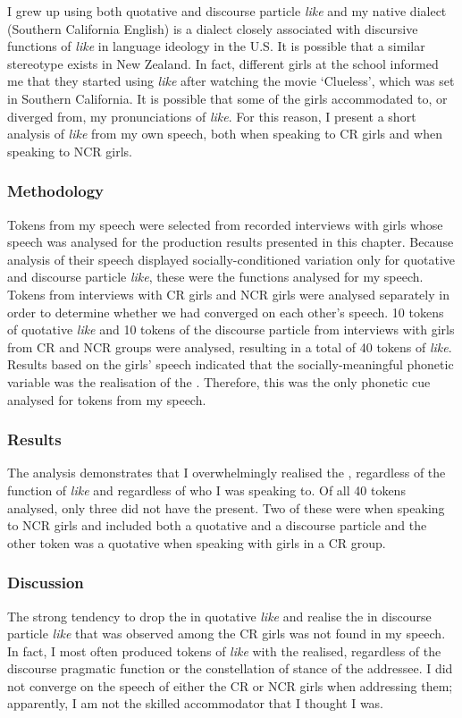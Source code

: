 I grew up using both quotative and discourse particle \textit{like} and my native dialect (Southern California English) is a dialect closely associated with discursive functions of \textit{like} in language ideology in the U.S. It is possible that a similar stereotype exists in New Zealand.  In fact, different girls at the school informed me that they started using \textit{like} after watching the movie `Clueless', which was set in Southern California.  It is possible that some of the girls accommodated to, or diverged from, my pronunciations of \textit{like}.  For this reason, I present a short analysis of \textit{like} from my own speech, both when speaking to CR girls and when speaking to NCR girls.

\subsubsection{Methodology}
Tokens from my speech were selected from recorded interviews with girls whose speech was analysed for the production results presented in this chapter.  Because analysis of their speech displayed socially-conditioned variation only for quotative and discourse particle \textit{like}, these were the functions analysed for my speech.  Tokens from interviews with CR girls and NCR girls were analysed separately in order to determine whether we had converged on each other's speech.  10 tokens of quotative \textit{like} and 10 tokens of the discourse particle from interviews with girls from CR and NCR groups were analysed, resulting in a total of 40 tokens of \textit{like}.  Results based on the girls' speech indicated that the socially-meaningful phonetic variable was the realisation of the .  Therefore, this was the only phonetic cue analysed for tokens from my speech.

\subsubsection{Results}
The analysis demonstrates that I overwhelmingly realised the , regardless of the function of \textit{like} and regardless of who I was speaking to.  Of all 40 tokens analysed, only three did not have the  present.  Two of these were when speaking to NCR girls and included both a quotative and a discourse particle and the other token was a quotative when speaking with girls in a CR group.  

\subsubsection{Discussion}
The strong tendency to drop the  in quotative \textit{like} and realise the  in discourse particle \textit{like} that was observed among the CR girls was not found in my speech.  In fact, I most often produced tokens of \textit{like} with the  realised, regardless of the discourse pragmatic function or the constellation of stance of the addressee.  I did not converge on the speech of either the CR or NCR girls when addressing them; apparently, I am not the skilled accommodator that I thought I was.  



